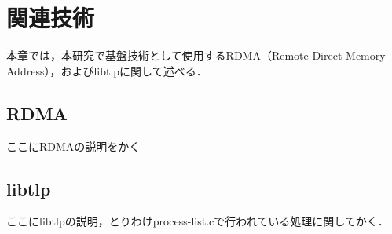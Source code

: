 \chapter{関連技術}
\label{chap:related_works}

本章では，本研究で基盤技術として使用するRDMA（Remote Direct Memory Address），およびlibtlpに関して述べる．

\section{RDMA}

ここにRDMAの説明をかく

\section{libtlp}

ここにlibtlpの説明，とりわけprocess-list.cで行われている処理に関してかく．
